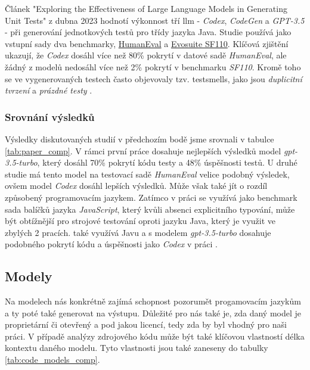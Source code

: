 \documentclass[czech, ma, kiv, he, iso690alph, pdf, viewonly]{fasthesis}
\begin{document}
    Článek "Exploring the Effectiveness of Large Language Models in Generating Unit Tests" \cite{siddiq2023exploring} z dubna 2023 hodnotí výkonnost tří \gls{llm} - \textit{Codex}, \textit{CodeGen} a \textit{GPT-3.5} - při generování jednotkových testů pro třídy jazyka Java. Studie používá jako vstupní sady dva benchmarky, \href{https://paperswithcode.com/dataset/humaneval-x}{HumanEval} a \href{https://paperswithcode.com/dataset/evosuite-sf110-benchmark}{Evosuite SF110}. Klíčová zjištění ukazují, že \textit{Codex} dosáhl více než 80\% pokrytí v datové sadě \textit{HumanEval}, ale žádný z modelů nedosáhl více než 2\% pokrytí v benchmarku \textit{SF110}. Kromě toho se ve vygenerovaných testech často objevovaly tzv. \gls{testsmells}, jako jsou \textit{duplicitní tvrzení} a \textit{prázdné testy} \cite{testsmells}.

    \subsubsection{Srovnání výsledků}
    Výsledky diskutovaných studií v předchozím bodě jsme srovnali v tabulce \ref{tab:paper_comp}. V rámci první práce dosahuje nejlepších výsledků model \textit{gpt-3.5-turbo}, který dosáhl 70\% pokrytí kódu testy a 48\% úspěšnosti testů. U druhé studie má tento model na testovací sadě \textit{HumanEval} velice podobný výsledek, ovšem model \textit{Codex} dosáhl lepších výsledků. Může však také jít o rozdíl způsobený programovacím jazykem. Zatímco v práci \cite{schafer2023empirical} se využívá jako benchmark sada balíčků jazyka \textit{JavaScript}, který kvůli absenci explicitního typování, může být obtížnější pro strojové testování oproti jazyku Java, který je využit ve zbylých 2 pracích. \cite{jutai} také využívá Javu a s modelem \textit{gpt-3.5-turbo} dosahuje podobného pokrytí kódu a úspěšnosti jako \textit{Codex} v práci \cite{siddiq2023exploring}.


    \subsection{Modely} \label{sec:research_models}
    Na  modelech nás konkrétně zajímá schopnost pozorumět progamovacím jazykům a ty poté také generovat na výstupu. Důležité pro nás také je, zda daný model je proprietární či otevřený a pod jakou licencí, tedy zda by byl vhodný pro naši práci. V případě analýzy zdrojového kódu může být také klíčovou vlastností délka kontextu daného modelu. Tyto vlastnosti jsou také zaneseny do tabulky \ref{tab:code_models_comp}.
\end{document}
